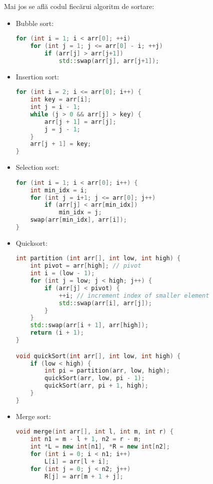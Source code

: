 \documentclass[12pt]{article}
\begin{document}
Mai jos se află codul fiecărui algoritm de sortare:
\begin{itemize}
    \item{Bubble sort:}
    \begin{lstlisting}[language=C++, caption={Bubble sort}, label=cod:part]
for (int i = 1; i < arr[0]; ++i)
    for (int j = 1; j <= arr[0] - i; ++j)
        if (arr[j] > arr[j+1])
            std::swap(arr[j], arr[j+1]);
\end{lstlisting}

\item{Insertion sort:}
    \begin{lstlisting}[language=C++, caption={Insertion sort}, label=cod:part]
for (int i = 2; i <= arr[0]; i++) {
    int key = arr[i];
    int j = i - 1;
    while (j > 0 && arr[j] > key) {
        arr[j + 1] = arr[j];
        j = j - 1;
    }
    arr[j + 1] = key;
}
\end{lstlisting}

\item{Selection sort:}
    \begin{lstlisting}[language=C++, caption={Selection sort}, label=cod:part]
for (int i = 1; i < arr[0]; i++) {
    int min_idx = i;
    for (int j = i+1; j <= arr[0]; j++)
        if (arr[j] < arr[min_idx])
            min_idx = j;
    swap(arr[min_idx], arr[i]);
}
\end{lstlisting}

\item{Quicksort:}
    \begin{lstlisting}[language=C++, caption={Quicksort}, label=cod:part]
int partition (int arr[], int low, int high) {
    int pivot = arr[high]; // pivot
    int i = (low - 1);
    for (int j = low; j < high; j++) {
        if (arr[j] < pivot) {
            ++i; // increment index of smaller element
            std::swap(arr[i], arr[j]);
        }
    }
    std::swap(arr[i + 1], arr[high]);
    return (i + 1);
}

void quickSort(int arr[], int low, int high) {
    if (low < high) {
        int pi = partition(arr, low, high);
        quickSort(arr, low, pi - 1);
        quickSort(arr, pi + 1, high);
    }
}
\end{lstlisting}

\item{Merge sort:}
    \begin{lstlisting}[language=C++, caption={Merge sort}, label=cod:part]
void merge(int arr[], int l, int m, int r) {
    int n1 = m - l + 1, n2 = r - m;
    int *L = new int[n1], *R = new int[n2];
    for (int i = 0; i < n1; i++)
        L[i] = arr[l + i];
    for (int j = 0; j < n2; j++)
        R[j] = arr[m + 1 + j];


\end{lstlisting}
\end{itemize}
\end{document}
